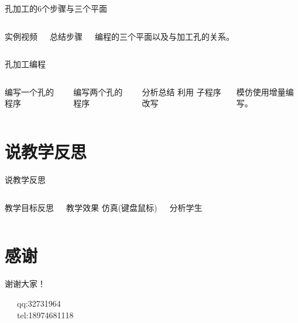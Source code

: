 \documentclass[utf8,zihao=-4,handout,smaller,aspectratio=1610]{ctexbeamer}
\begin{document}
\begin{frame}{孔加工的6个步骤与三个平面}
	\begin{columns}
		\column{\textwidth}
		
		实例视频
		
		总结步骤
		
		编程的三个平面以及与加工孔的关系。
		
	\end{columns}
\end{frame}

\begin{frame}{孔加工编程}
	\begin{columns}
		\column{0\textwidth}
		\column{\textwidth}
		
	编写一个孔的程序
	
	编写两个孔的程序
	
	分析总结 利用 子程序改写
	
	模仿使用增量编写。
	
		\column{0\textwidth}
	\end{columns}
\end{frame}

\section{说教学反思}
\begin{frame}{说教学反思}
    \begin{columns}
        \column{\textwidth}
        
        教学目标反思
        
        教学效果
          仿真(键盘鼠标)
        
        分析学生
        
    \end{columns}
\end{frame}




\section*{感谢}
\begin{frame}[plain]
\vfill

\centering \huge 谢谢大家！

\vfill

\flushleft \footnotesize   
~~~qq:32731964\\
~~~tel:18974681118\\

\end{frame}
\end{document}
